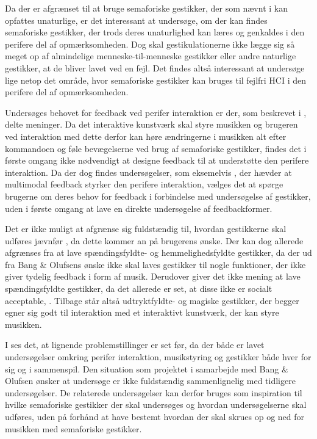 Da der er afgrænset til at bruge semaforiske gestikker, der som nævnt i  kan opfattes unaturlige, er det interessant at undersøge, om der kan findes semaforiske gestikker, der trods deres unaturlighed kan læres og genkaldes i den perifere del af opmærksomheden. Dog skal gestikulationerne ikke lægge sig så meget op af almindelige menneske-til-menneske gestikker eller andre naturlige gestikker, at de bliver lavet ved en fejl. Det findes altså interessant at undersøge lige netop det område, hvor semaforiske gestikker kan bruges til fejlfri HCI i den perifere del af opmærksomheden. 

Undersøges behovet for feedback ved perifer interaktion er der, som beskrevet i , delte meninger. Da det interaktive kunstværk skal styre musikken og brugeren ved interaktion med dette derfor kan høre ændringerne i musikken alt efter kommandoen og føle bevægelserne ved brug af semaforiske gestikker, findes det i første omgang ikke nødvendigt at designe feedback til at understøtte den perifere interaktion. Da der dog findes undersøgelser, som eksemelvis \textcite[s. 21]{PDF:FacilitatingPIDesignAndEvaluation}, der hævder at multimodal feedback styrker den perifere interaktion, vælges det at spørge brugerne om deres behov for feedback i forbindelse med undersøgelse af gestikker, uden i første omgang at lave en direkte undersøgelse af feedbackformer. 

Det er ikke muligt at afgrænse sig fuldstændig til, hvordan gestikkerne skal udføres jævnfør , da dette kommer an på brugerens ønske. Der kan dog allerede afgrænses fra at lave spændingsfyldte- og hemmelighedsfyldte gestikker, da der ud fra Bang $\&$ Olufsens ønske ikke skal laves gestikker til nogle funktioner, der ikke giver tydelig feedback i form af musik. Derudover giver det ikke mening at lave spændingsfyldte gestikker, da det allerede er set, at disse ikke er socialt acceptable, \parencite{PDF:WouldYouDoThat}. Tilbage står altså udtryktfyldte- og magiske gestikker, der begger egner sig godt til interaktion med et interaktivt kunstværk, der kan styre musikken. 

I  ses det, at lignende problemstillinger er set før, da der både er lavet undersøgelser omkring perifer interaktion, musikstyring og gestikker både hver for sig og i sammenspil. Den situation som projektet i samarbejde med Bang $\&$ Olufsen ønsker at undersøge er ikke fuldstændig sammenlignelig med tidligere undersøgelser. De relaterede undersøgelser kan derfor bruges som inspiration til hvilke semaforiske gestikker der skal undersøges og hvordan undersøgelserne skal udføres, uden på forhånd at have bestemt hvordan der skal skrues op og ned for musikken med semaforiske gestikker. 



